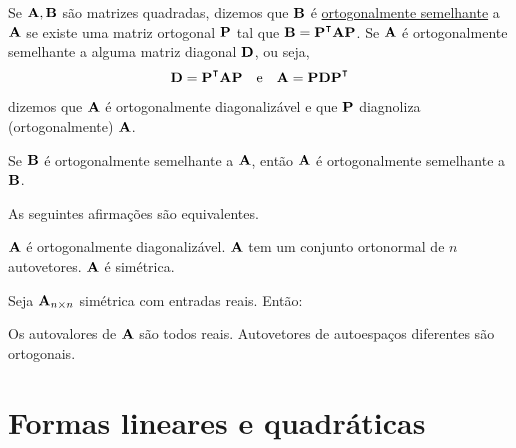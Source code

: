 \begin{definition}
	\leavevmode
	\begin{outline}[enumerate]
		\1 Se $\mathbf{A}, \mathbf{B}$ são matrizes quadradas, dizemos que $\mathbf{B}$ é \uline{ortogonalmente semelhante} a $\mathbf{A}$ se existe uma matriz ortogonal $\mathbf{P}$ tal que $\m{B}=\m{P}\T\m{A}\m{P}$.
		\1 Se $\mathbf{A}$ é ortogonalmente semelhante a alguma matriz diagonal $\mathbf{D}$, ou seja,
		\begin{equation}
			\m{D} = \m{P}\T\m{A}\m{P} \quad \text{e} \quad \m{A} = \m P \m D \m P\T
		\end{equation}
		dizemos que $\mathbf{A}$ é ortogonalmente diagonalizável e que $\mathbf{P}$ diagnoliza (ortogonalmente) $\mathbf{A}$. 
	\end{outline}
	\begin{note}
		\begin{outline}[enumerate]
			\1 Se $\mathbf{B}$ é ortogonalmente semelhante a $\mathbf{A}$, então $\mathbf{A}$ é ortogonalmente semelhante a $\mathbf{B}$.
		\end{outline}
	\end{note}
\end{definition}

\begin{theorem} As seguintes afirmações são equivalentes.
	\begin{outline}[enumerate]
		\1 $\mathbf{A}$ é ortogonalmente diagonalizável.
		\1 $\mathbf{A}$ tem um conjunto ortonormal de $n$ autovetores.
		\1 $\mathbf{A}$ é simétrica.
	\end{outline}
\end{theorem}


\begin{theorem} Seja $\mathbf{A}_{n\times n}$ simétrica com entradas reais. Então:
	\leavevmode
	\begin{outline}[enumerate]
		\1 Os autovalores de $\mathbf{A}$ são todos reais.
		\1 Autovetores de autoespaços diferentes são ortogonais.
	\end{outline} 
\end{theorem}


\section{Formas lineares e quadráticas}




